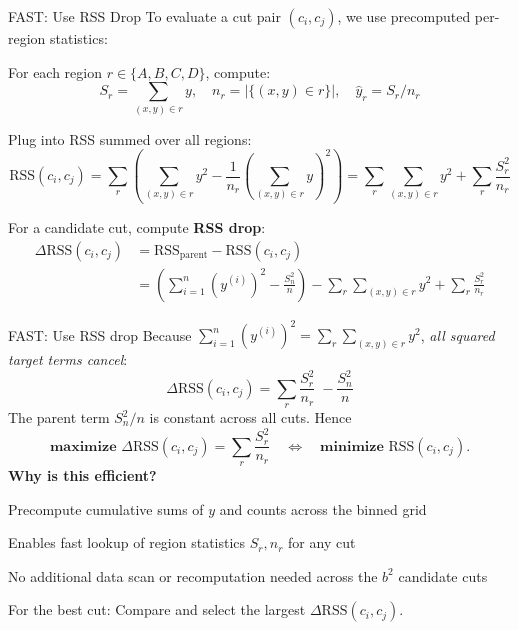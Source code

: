 \documentclass[10pt,compress,t,notes=noshow, xcolor=table]{beamer}
\begin{document}
\begin{framev}[fs=small,align=top]{FAST: Use RSS Drop}
To evaluate a cut pair $(c_i, c_j)$, we use precomputed per-region statistics:
\begin{itemizeM}
\item For each region $r \in \{A, B, C, D\}$, compute:
$$
S_r = \sum_{(x,y)\in r} y,\quad
n_r = |\{(x,y)\in r\}|,\quad
\hat y_r = S_r / n_r
$$
\item Plug into RSS summed over all regions:
$$
\text{RSS}(c_i, c_j) = \sum_{r} \left( \sum_{(x,y) \in r} y^2 - \frac{1}{n_r} \left(\sum_{(x,y) \in r} y \right)^2 \right) =
\sum_{r}\sum_{(x,y)\in r} y^2+\sum_{r}\frac{S_r^{2}}{n_r}
$$
\item For a candidate cut, compute \textbf{RSS drop}:
$$
\begin{aligned}
\Delta\text{RSS}(c_i,c_j)
&=\text{RSS}_{\text{parent}}-\text{RSS}(c_i,c_j)\\
&=\left(\sum_{i = 1}^n \left(y^{(i)}\right)^{2} -\frac{S_n^{2}}{n}\right)
- \sum_{r}\sum_{(x,y)\in r} y^2+\sum_{r}\frac{S_r^{2}}{n_r}
\end{aligned}
$$
\end{itemizeM}
\end{framev}
\begin{framev}[fs=small,align=top]{FAST: Use RSS drop}
Because $\sum_{i = 1}^n \left(y^{(i)}\right) ^{2} = \sum_{r}\sum_{(x,y)\in r} y^2$, \emph{all squared target terms cancel}:
$$
\boxed{\displaystyle
\Delta\text{RSS}(c_i,c_j)
=\sum_{r}\frac{S_r^{2}}{n_r}\;-
\frac{S_n^{2}}{n}}
$$
The parent term $S_n^{2}/n$ is constant across all cuts. Hence
$$
\textbf{maximize }\Delta\text{RSS}(c_i,c_j)=\sum_{r}\frac{S_r^{2}}{n_r}
\quad\Longleftrightarrow\quad
\textbf{minimize }\text{RSS}(c_i,c_j).
$$
\textbf{Why is this efficient?}
\begin{itemizeM}
\item Precompute cumulative sums of $y$ and counts across the binned grid
\item Enables fast lookup of region statistics $S_r, n_r$ for any cut
\item No additional data scan or recomputation needed across the $b^2$ candidate cuts
\item For the best cut: Compare and select the largest $\Delta\text{RSS}(c_i,c_j)$.
\end{itemizeM}
\end{framev}
\end{document}
